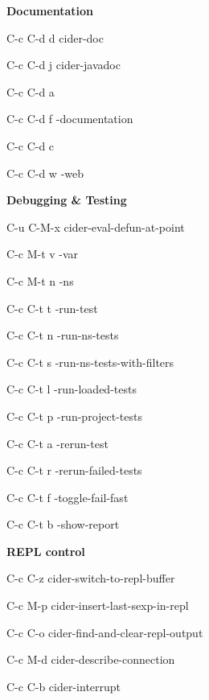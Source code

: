 \documentclass[a4paper,10pt]{article}
\renewcommand\section[1]{\bigskip\par\textbf{\large#1}\medskip}
\newcommand\keyify[1]{\keys{\ttfamily#1}}
\begin{document}
\begin{multicols}{2}
\section{Documentation}
\begin{keylist}[labelwidth=\widthof{\keyify{C-c C-d d}}]
  \item[C-c C-d d] cider-doc
  \item[C-c C-d j] cider-javadoc
  \item[C-c C-d a] 
  \item[C-c C-d f] \ns          -documentation
  \item[C-c C-d c] 
  \item[C-c C-d w] \ns              -web
\end{keylist}

\section{Debugging \& Testing}
\begin{keylist}[labelwidth=\widthof{\keyify{C-u C-M-x}}]
  \item[C-u C-M-x] cider-eval-defun-at-point
  \item[C-c M-t v] -var
  \item[C-c M-t n] \ns                    -ns
  \item[C-c C-t t] -run-test
  \item[C-c C-t n] \ns            -run-ns-tests
  \item[C-c C-t s] \ns            -run-ns-tests-with-filters
  \item[C-c C-t l] \ns            -run-loaded-tests
  \item[C-c C-t p] \ns            -run-project-tests
  \item[C-c C-t a] \ns            -rerun-test
  \item[C-c C-t r] \ns            -rerun-failed-tests
  \item[C-c C-t f] \ns            -toggle-fail-fast
  \item[C-c C-t b] \ns            -show-report
\end{keylist}

\section{REPL control}
\begin{keylist}[labelwidth=\widthof{\keyify{C-c C-z}}]
  \item[C-c C-z] cider-switch-to-repl-buffer
  \item[C-c M-p] cider-insert-last-sexp-in-repl
  \item[C-c C-o] cider-find-and-clear-repl-output
  \item[C-c M-d] cider-describe-connection
  \item[C-c C-b] cider-interrupt
\end{keylist}
\end{multicols}
\end{document}
